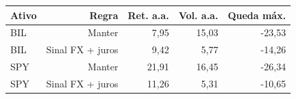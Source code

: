 \begin{tabular}{lrrrr}
\toprule
Ativo & Regra & Ret. a.a. & Vol. a.a. & Queda máx. \\
\midrule
BIL & Manter & 7,95 & 15,03 & -23,53 \\
BIL & Sinal FX + juros & 9,42 & 5,77 & -14,26 \\
SPY & Manter & 21,91 & 16,45 & -26,34 \\
SPY & Sinal FX + juros & 11,26 & 5,31 & -10,65 \\
\bottomrule
\end{tabular}